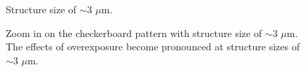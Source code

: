 \begin{figure}[H]
	\centering
	\caption{Structure size of $\sim$3 $\mu$m.}
	\label{fig:b2d8_q8}
\end{figure}
\begin{figure}[H]
	\centering
	\caption{Zoom in on the checkerboard pattern with structure size of $\sim$3 $\mu$m. The effects of overexposure become pronounced at structure sizes of $\sim$3 $\mu$m.}
	\label{fig:b2d9_q9}
\end{figure}

